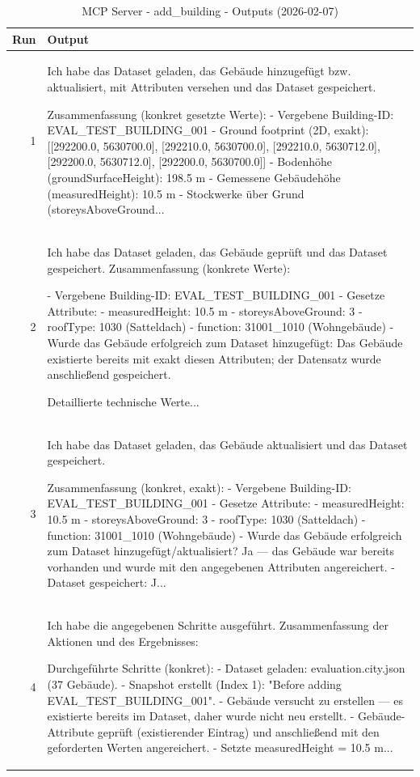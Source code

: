\documentclass[a4paper,11pt]{article}
\begin{document}
\begin{table}[ht]
\centering
\scriptsize
\caption{MCP Server - add\_building - Outputs (2026-02-07)}
\label{tab:mcp\_add\_building\_outputs\_2026-02-07}
\begin{tabular}{r p{12cm}}
\hline
Run & Output \\
\hline
1 & Ich habe das Dataset geladen, das Gebäude hinzugefügt bzw. aktualisiert, mit Attributen versehen und das Dataset gespeichert.

Zusammenfassung (konkret gesetzte Werte):
- Vergebene Building-ID: EVAL\_TEST\_BUILDING\_001
- Ground footprint (2D, exakt): [[292200.0, 5630700.0], [292210.0, 5630700.0], [292210.0, 5630712.0], [292200.0, 5630712.0], [292200.0, 5630700.0]]
- Bodenhöhe (groundSurfaceHeight): 198.5 m
- Gemessene Gebäudehöhe (measuredHeight): 10.5 m
- Stockwerke über Grund (storeysAboveGround... \\
2 & Ich habe das Dataset geladen, das Gebäude geprüft und das Dataset gespeichert. Zusammenfassung (konkrete Werte):

- Vergebene Building-ID: EVAL\_TEST\_BUILDING\_001
- Gesetze Attribute:
  - measuredHeight: 10.5 m
  - storeysAboveGround: 3
  - roofType: 1030 (Satteldach)
  - function: 31001\_1010 (Wohngebäude)
- Wurde das Gebäude erfolgreich zum Dataset hinzugefügt: Das Gebäude existierte bereits mit exakt diesen Attributen; der Datensatz wurde anschließend gespeichert.

Detaillierte technische Werte... \\
3 & Ich habe das Dataset geladen, das Gebäude aktualisiert und das Dataset gespeichert.

Zusammenfassung (konkret, exakt):
- Vergebene Building-ID: EVAL\_TEST\_BUILDING\_001
- Gesetze Attribute:
  - measuredHeight: 10.5 m
  - storeysAboveGround: 3
  - roofType: 1030 (Satteldach)
  - function: 31001\_1010 (Wohngebäude)
- Wurde das Gebäude erfolgreich zum Dataset hinzugefügt/aktualisiert? Ja — das Gebäude war bereits vorhanden und wurde mit den angegebenen Attributen angereichert.
- Dataset gespeichert: J... \\
4 & Ich habe die angegebenen Schritte ausgeführt. Zusammenfassung der Aktionen und des Ergebnisses:

Durchgeführte Schritte (konkret):
- Dataset geladen: evaluation.city.json (37 Gebäude).
- Snapshot erstellt (Index 1): "Before adding EVAL\_TEST\_BUILDING\_001".
- Gebäude versucht zu erstellen — es existierte bereits im Dataset, daher wurde nicht neu erstellt.
- Gebäude-Attribute geprüft (existierender Eintrag) und anschließend mit den geforderten Werten angereichert.
  - Setzte measuredHeight = 10.5 m... \\
\hline
\end{tabular}
\end{table}

\clearpage
\end{document}
